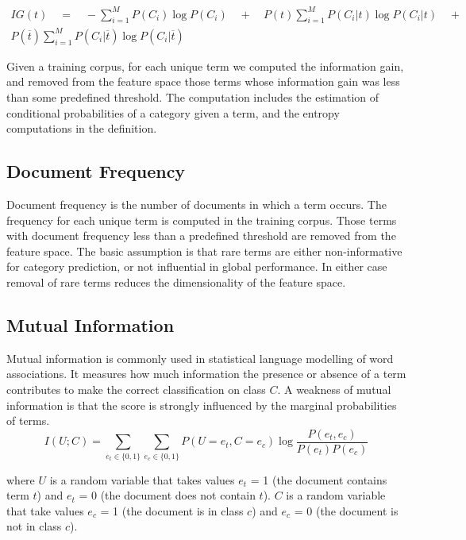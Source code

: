 \documentclass[a4paper, 14pt]{article}
\begin{document}
\begin{justify}
\begin{justify}
\begin{align*}
    IG(t)\quad  = \quad  -\sum_{i=1}^{M}{P(C_{i})\log{P(C_{i})}}  \quad + \quad
            P(t)\sum_{i=1}^{M}{P(C_{i}|t)\log{P(C_{i}|t)}} \quad + \quad \\
            P(\overline{t})\sum_{i=1}^{M}{P(C_{i}|\overline{t})\log{P(C_i|\overline{t})}}
\end{align*}
    
\justify
Given a training corpus, for each unique term we computed the information gain, and removed from the feature space those terms whose information gain was less than some predefined threshold. The computation includes the estimation of conditional probabilities of a category given a term, and the entropy computations in the definition.
\end{justify}


\subsection{Document Frequency}
\begin{justify}
Document frequency is the number of documents in which a term occurs. The frequency for each unique term is computed in the training corpus. Those terms with document frequency less than a predefined threshold are removed from the feature space. The basic assumption is that rare terms are either non-informative for category prediction, or not influential in global performance. In either case removal of rare terms reduces the dimensionality of the feature space. 
\end{justify}

\subsection{Mutual Information}
\begin{justify}
Mutual information\cite{cmu} is commonly used in statistical language modelling of word associations. It measures how much information the presence or absence of a term contributes to make the correct classification on class $C$. A weakness of mutual information is that the score is strongly influenced by the marginal probabilities of terms. \\ 

\[
I(U;C) = \sum_{e_t \in \{0,1\}}{\sum_{e_c \in \{0,1\}}{
P(U = e_{t}, C = e_{c})\log{\dfrac{P(e_{t}, e_{c})}{P(e_{t})P(e_{c})}}
}}
\]

\justify
where $U$ is a random variable that takes values ${e_t}$ = 1 (the document contains term $t$) and ${e_t}$ = 0 (the document does not contain $t$).
$C$ is a random variable that take values ${e_c}$ = 1 (the document is in class $c$) and ${e_c}$ = 0 (the document is not in class $c$).

\end{justify}

\end{justify}
\end{document}
